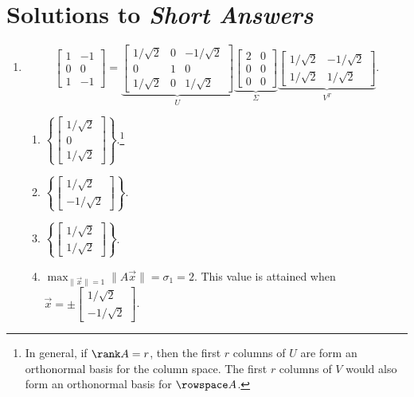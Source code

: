 \section{Solutions to \textit{Short Answers}}
\begin{enumerate}
	\item 
	\[\begin{bmatrix}1 & -1 \\ 0 & 0 \\ 1 & -1\end{bmatrix} = \underbrace{\begin{bmatrix}1/\sqrt{2} & 0  & -1/\sqrt{2} \\ 0 & 1 & 0 \\ 1/\sqrt{2} & 0 & 1/\sqrt{2}\end{bmatrix}}_U \underbrace{\begin{bmatrix}2 & 0 \\ 0 & 0 \\ 0 & 0\end{bmatrix}}_\Sigma\underbrace{\begin{bmatrix}1/\sqrt{2} & -1/\sqrt{2} \\ 1/\sqrt{2} & 1/\sqrt{2}\end{bmatrix}}_{V^T}.\]
		\begin{enumerate}
			\item \(\left\{ \begin{bmatrix}1/\sqrt{2} \\ 0 \\ 1/\sqrt{2}\end{bmatrix} \right\}\).\footnote{In general, if \(\rank A = r\), then the first \(r\)
				 columns of \(U\) are form an orthonormal basis for the column space. The first \(r\) columns of \(V\) would also form an orthonormal
				 basis for \(\rowspace A\).}
			\item \(\left\{ \begin{bmatrix}1/\sqrt{2} \\ -1/\sqrt{2}\end{bmatrix} \right\}\).
			\item \(\left\{ \begin{bmatrix}1/\sqrt{2} \\ 1/\sqrt{2}\end{bmatrix} \right\}\).
			\item \(\max_{\|\vec{x}\| = 1} \|A\vec{x}\| = \sigma_1 = 2\). This value is attained when 
				\(\vec{x} = \pm\begin{bmatrix}1/\sqrt{2} \\ -1/\sqrt{2}\end{bmatrix}\).

\end{enumerate}
\end{enumerate}
